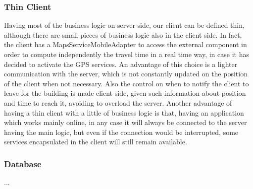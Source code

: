 \subsubsection{Thin Client}
Having most of the business logic on server side, our client can be defined thin, although there are small pieces of business logic also in the client side. In fact, the client has a MapsServiceMobileAdapter to access the external component in order to compute independently the travel time in a real time way, in case it has decided to activate the GPS services. An advantage of this choice is a lighter communication with the server, which is not constantly updated on the position of the client when not necessary. Also the control on when to notify the client to leave for the building is made client side, given such information about position and time to reach it, avoiding to overload the server.
Another advantage of having a thin client with a little of business logic is that, having an application which works mainly online, in any case it will always be connected to the server having the main logic, but even if the connection would be interrupted, some services encapsulated in the client will still remain available.
\subsubsection{Database}
...
\newpage
